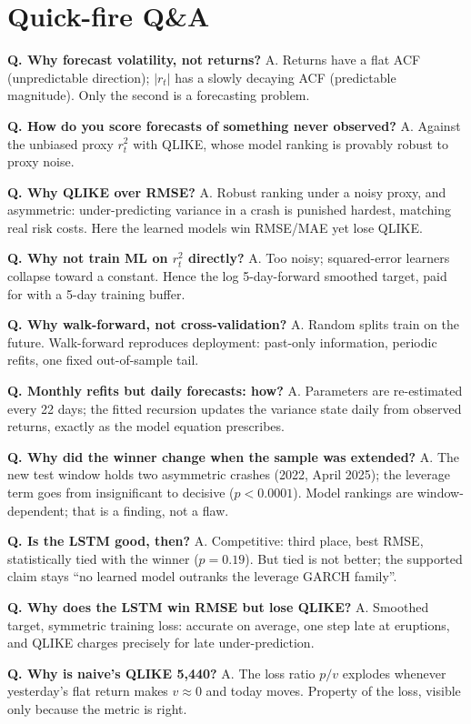 \documentclass[a4paper,10pt]{article}
\begin{document}
\section*{Quick-fire Q\&A}

\textbf{Q. Why forecast volatility, not returns?} A. Returns have a flat ACF (unpredictable direction); $|r_t|$ has a slowly decaying ACF (predictable magnitude). Only the second is a forecasting problem.

\textbf{Q. How do you score forecasts of something never observed?} A. Against the unbiased proxy $r_t^2$ with QLIKE, whose model ranking is provably robust to proxy noise.

\textbf{Q. Why QLIKE over RMSE?} A. Robust ranking under a noisy proxy, and asymmetric: under-predicting variance in a crash is punished hardest, matching real risk costs. Here the learned models win RMSE/MAE yet lose QLIKE.

\textbf{Q. Why not train ML on $r_t^2$ directly?} A. Too noisy; squared-error learners collapse toward a constant. Hence the log 5-day-forward smoothed target, paid for with a 5-day training buffer.

\textbf{Q. Why walk-forward, not cross-validation?} A. Random splits train on the future. Walk-forward reproduces deployment: past-only information, periodic refits, one fixed out-of-sample tail.

\textbf{Q. Monthly refits but daily forecasts: how?} A. Parameters are re-estimated every 22 days; the fitted recursion updates the variance state daily from observed returns, exactly as the model equation prescribes.

\textbf{Q. Why did the winner change when the sample was extended?} A. The new test window holds two asymmetric crashes (2022, April 2025); the leverage term goes from insignificant to decisive ($p<0.0001$). Model rankings are window-dependent; that is a finding, not a flaw.

\textbf{Q. Is the LSTM good, then?} A. Competitive: third place, best RMSE, statistically tied with the winner ($p=0.19$). But tied is not better; the supported claim stays ``no learned model outranks the leverage GARCH family''.

\textbf{Q. Why does the LSTM win RMSE but lose QLIKE?} A. Smoothed target, symmetric training loss: accurate on average, one step late at eruptions, and QLIKE charges precisely for late under-prediction.

\textbf{Q. Why is naive's QLIKE 5{,}440?} A. The loss ratio $p/v$ explodes whenever yesterday's flat return makes $v\approx 0$ and today moves. Property of the loss, visible only because the metric is right.
\end{document}
